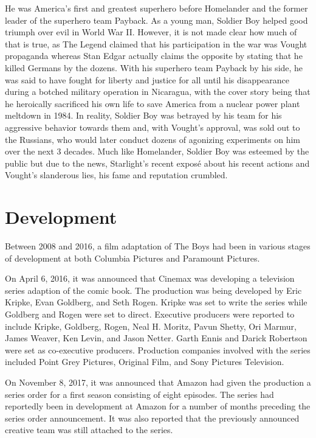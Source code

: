 \documentclass[12pt]{article}
\begin{document}
\begin{itemize}
    He was America's first and greatest superhero before Homelander and the former leader of the superhero team Payback. As a young man, Soldier Boy helped good triumph over evil in World War II. However, it is not made clear how much of that is true, as The Legend claimed that his participation in the war was Vought propaganda whereas Stan Edgar actually claims the opposite by stating that he killed Germans by the dozens. With his superhero team Payback by his side, he was said to have fought for liberty and justice for all until his disappearance during a botched military operation in Nicaragua, with the cover story being that he heroically sacrificed his own life to save America from a nuclear power plant meltdown in 1984. In reality, Soldier Boy was betrayed by his team for his aggressive behavior towards them and, with Vought's approval, was sold out to the Russians, who would later conduct dozens of agonizing experiments on him over the next 3 decades. Much like Homelander, Soldier Boy was esteemed by the public but due to the news, Starlight's recent exposé about his recent actions and Vought's slanderous lies, his fame and reputation crumbled.
\end{itemize}

\section{Development}
Between 2008 and 2016, a film adaptation of The Boys had been in various stages of development at both Columbia Pictures and Paramount Pictures.

On April 6, 2016, it was announced that Cinemax was developing a television series adaption of the comic book. The production was being developed by Eric Kripke, Evan Goldberg, and Seth Rogen. Kripke was set to write the series while Goldberg and Rogen were set to direct. Executive producers were reported to include Kripke, Goldberg, Rogen, Neal H. Moritz, Pavun Shetty, Ori Marmur, James Weaver, Ken Levin, and Jason Netter. Garth Ennis and Darick Robertson were set as co-executive producers. Production companies involved with the series included Point Grey Pictures, Original Film, and Sony Pictures Television.

On November 8, 2017, it was announced that Amazon had given the production a series order for a first season consisting of eight episodes. The series had reportedly been in development at Amazon for a number of months preceding the series order announcement. It was also reported that the previously announced creative team was still attached to the series.
\end{document}
